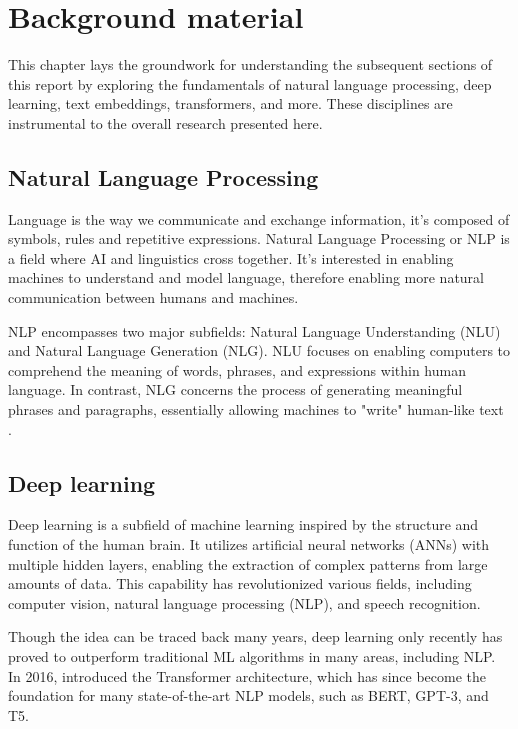 \documentclass[12pt]{article}
\begin{document}
\newpage

\section{Background material}

This chapter lays the groundwork for understanding the subsequent sections of this report by exploring the fundamentals of natural language processing, deep learning, text embeddings, transformers, and more. These disciplines are instrumental to the overall research presented here.

\subsection{Natural Language Processing}

Language is the way we communicate and exchange information, it’s composed of symbols, rules and repetitive expressions. Natural Language Processing or NLP is a field where AI and linguistics cross together. It's interested in enabling machines to understand and model language, therefore enabling more natural communication between humans and machines.

NLP encompasses two major subfields: Natural Language Understanding (NLU) and Natural Language Generation (NLG). NLU focuses on enabling computers to comprehend the meaning of words, phrases, and expressions within human language. In contrast, NLG concerns the process of generating meaningful phrases and paragraphs, essentially allowing machines to "write" human-like text \cite{Khurana2023}.

\subsection{Deep learning}

Deep learning is a subfield of machine learning inspired by the structure and function of the human brain. It utilizes artificial neural networks (ANNs) with multiple hidden layers, enabling the extraction of complex patterns from large amounts of data. This capability has revolutionized various fields, including computer vision, natural language processing (NLP), and speech recognition.

Though the idea can be traced back many years, deep learning only recently has proved to outperform traditional ML algorithms in many areas, including NLP. In 2016, \cite{Vaswani2017} introduced the Transformer architecture, which has since become the foundation for many state-of-the-art NLP models, such as BERT, GPT-3, and T5.
\end{document}

